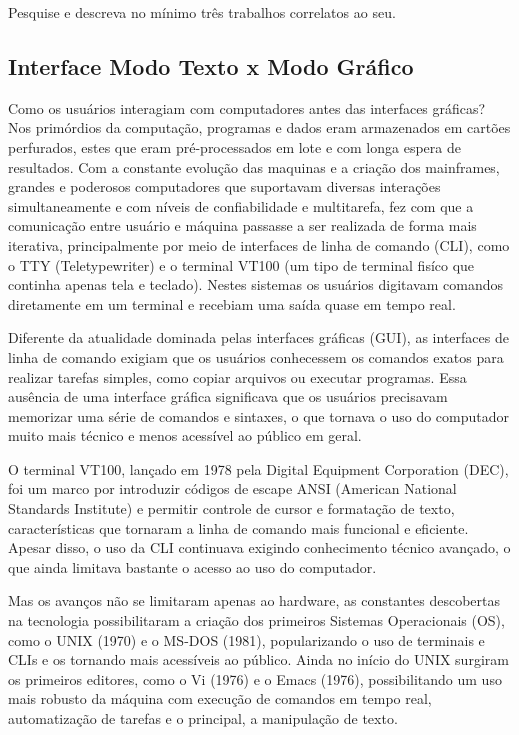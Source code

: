 Pesquise e descreva no mínimo três trabalhos correlatos ao seu.

\subsection{Interface Modo Texto x Modo Gráfico}

Como os usuários interagiam com computadores antes das interfaces gráficas? Nos primórdios da computação, programas e dados eram armazenados em cartões
perfurados, estes que eram pré-processados em lote e com longa espera de resultados. Com a constante evolução das maquinas e a criação dos mainframes,
grandes e poderosos computadores que suportavam diversas interações simultaneamente e com níveis de confiabilidade e multitarefa, fez com que a comunicação
entre usuário e máquina passasse a ser realizada de forma mais iterativa, principalmente por meio de interfaces de linha de comando (CLI),
como o TTY (Teletypewriter) e o terminal VT100 (um tipo de terminal fisíco que continha apenas tela e teclado). Nestes sistemas os usuários digitavam
comandos diretamente em um terminal e recebiam uma saída quase em tempo real.

Diferente da atualidade dominada pelas interfaces gráficas (GUI), as interfaces de linha de comando exigiam que os usuários conhecessem os comandos exatos
para realizar tarefas simples, como copiar arquivos ou executar programas. Essa ausência de uma interface gráfica significava que os usuários precisavam
memorizar uma série de comandos e sintaxes, o que tornava o uso do computador muito mais técnico e menos acessível ao público em geral.

O terminal VT100, lançado em 1978 pela Digital Equipment Corporation (DEC), foi um marco por introduzir códigos de escape ANSI (American National Standards
Institute) e permitir controle de cursor e formatação de texto, características que tornaram a linha de comando mais funcional e eficiente. Apesar disso,
o uso da CLI continuava exigindo conhecimento técnico avançado, o que ainda limitava bastante o acesso ao uso do computador.

Mas os avanços não se limitaram apenas ao hardware, as constantes descobertas na tecnologia possibilitaram a criação dos primeiros Sistemas Operacionais (OS),
como o UNIX (1970) e o MS-DOS (1981), popularizando o uso de terminais e CLIs e os tornando mais acessíveis ao público. Ainda no início do UNIX surgiram
os primeiros editores, como o Vi (1976) e o Emacs (1976), possibilitando um uso mais robusto da máquina com execução de comandos em tempo real,
automatização de tarefas e o principal, a manipulação de texto.

